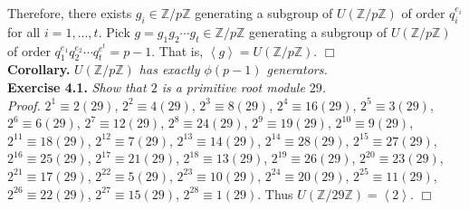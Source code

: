\documentclass{article}
\begin{document}
Therefore, there exists $g_i \in \mathbb{Z}/p\mathbb{Z}$ generating a subgroup of
$U(\mathbb{Z}/p\mathbb{Z})$ of order $q_i^{e_i}$ for all $i = 1, ..., t$.
Pick $g = g_1 g_2 \cdots g_t \in \mathbb{Z}/p\mathbb{Z}$ generating a subgroup of
$U(\mathbb{Z}/p\mathbb{Z})$ of order $q_1^{e_1} q_2^{e_2} \cdots q_t^{e^t} = p - 1$.
That is, $\left \langle g \right \rangle = U(\mathbb{Z}/p\mathbb{Z})$.
$\Box$ \\

\textbf{Corollary.} \emph{$U(\mathbb{Z}/p\mathbb{Z})$ has exactly $\phi(p - 1)$ generators.} \\

\textbf{Exercise 4.1.} \emph{Show that $2$ is a primitive root module $29$.}\\

\emph{Proof.}
$2^1 \equiv 2 (29)$,
$2^2 \equiv 4 (29)$,
$2^3 \equiv 8 (29)$,
$2^4 \equiv 16 (29)$,
$2^5 \equiv 3 (29)$,
$2^6 \equiv 6 (29)$,
$2^7 \equiv 12 (29)$,
$2^8 \equiv 24 (29)$,
$2^9 \equiv 19 (29)$,
$2^{10} \equiv 9 (29)$,
$2^{11} \equiv 18 (29)$,
$2^{12} \equiv 7 (29)$,
$2^{13} \equiv 14 (29)$,
$2^{14} \equiv 28 (29)$,
$2^{15} \equiv 27 (29)$,
$2^{16} \equiv 25 (29)$,
$2^{17} \equiv 21 (29)$,
$2^{18} \equiv 13 (29)$,
$2^{19} \equiv 26 (29)$,
$2^{20} \equiv 23 (29)$,
$2^{21} \equiv 17 (29)$,
$2^{22} \equiv 5 (29)$,
$2^{23} \equiv 10 (29)$,
$2^{24} \equiv 20 (29)$,
$2^{25} \equiv 11 (29)$,
$2^{26} \equiv 22 (29)$,
$2^{27} \equiv 15 (29)$,
$2^{28} \equiv 1 (29)$. Thus
$U(\mathbb{Z}/29\mathbb{Z}) = \left \langle 2 \right \rangle$.
$\Box$ \\
\end{document}
